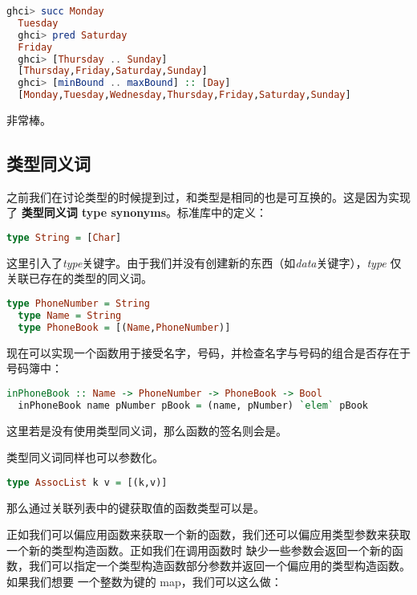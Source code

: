\documentclass[./main.tex]{subfiles}
\begin{document}
\begin{lstlisting}[language=Haskell]
  ghci> succ Monday
  Tuesday
  ghci> pred Saturday
  Friday
  ghci> [Thursday .. Sunday]
  [Thursday,Friday,Saturday,Sunday]
  ghci> [minBound .. maxBound] :: [Day]
  [Monday,Tuesday,Wednesday,Thursday,Friday,Saturday,Sunday]
\end{lstlisting}

非常棒。

\subsection*{类型同义词}

之前我们在讨论类型的时候提到过，\acode{[Char]}和类型是相同的也是可互换的。这是因为实现了
\textbf{类型同义词 type synonyms}。标准库中的定义：

\begin{lstlisting}[language=Haskell]
  type String = [Char]
\end{lstlisting}

这里引入了\textit{type}关键字。由于我们并没有创建新的东西（如\textit{data}关键字），\textit{type}
仅关联已存在的类型的同义词。

\begin{lstlisting}[language=Haskell]
  type PhoneNumber = String
  type Name = String
  type PhoneBook = [(Name,PhoneNumber)]
\end{lstlisting}

现在可以实现一个函数用于接受名字，号码，并检查名字与号码的组合是否存在于号码簿中：

\begin{lstlisting}[language=Haskell]
  inPhoneBook :: Name -> PhoneNumber -> PhoneBook -> Bool
  inPhoneBook name pNumber pBook = (name, pNumber) `elem` pBook
\end{lstlisting}

这里若是没有使用类型同义词，那么函数的签名则会是。

类型同义词同样也可以参数化。

\begin{lstlisting}[language=Haskell]
  type AssocList k v = [(k,v)]
\end{lstlisting}

那么通过关联列表中的键获取值的函数类型可以是。

正如我们可以偏应用函数来获取一个新的函数，我们还可以偏应用类型参数来获取一个新的类型构造函数。正如我们在调用函数时
缺少一些参数会返回一个新的函数，我们可以指定一个类型构造函数部分参数并返回一个偏应用的类型构造函数。如果我们想要
一个整数为键的 map，我们可以这么做：
\end{document}

